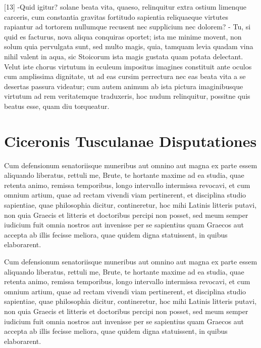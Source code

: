 \documentclass[11pt,b5paper,twoside]{book}
\begin{document}
[13] -Quid igitur? solane beata vita, quaeso, relinquitur extra ostium limenque carceris, cum constantia gravitas fortitudo sapientia reliquaeque virtutes rapiantur ad tortorem nullumque recusent nec supplicium nec dolorem? - Tu, si quid es facturus, nova aliqua conquiras oportet; ista me minime movent, non solum quia pervulgata sunt, sed multo magis, quia, tamquam levia quadam vina nihil valent in aqua, sic Stoicorum ista magis gustata quam potata delectant. Velut iste chorus virtutum in eculeum impositus imagines constituit ante oculos cum amplissima dignitate, ut ad eas cursim perrectura nec eas beata vita a se desertas passura videatur; cum autem animum ab ista pictura imaginibusque virtutum ad rem veritatemque traduxeris, hoc nudum relinquitur, possitne quis beatus esse, quam diu torqueatur.
\beginnumbering
\numberpstarttrue
{}

\chapter*{Ciceronis Tusculanae Disputationes}

\pstart%
Cum defensionum  senatoriisque muneribus aut omnino aut magna ex parte essem aliquando liberatus, rettuli me, Brute, te hortante maxime ad ea studia, quae retenta animo, remissa temporibus, longo intervallo intermissa revocavi, et cum omnium artium, quae ad rectam vivendi viam pertinerent,  et disciplina studio sapientiae, quae philosophia dicitur, contineretur, hoc mihi Latinis litteris  putavi, non quia  Graecis et litteris et doctoribus percipi non posset, sed meum semper iudicium fuit omnia nostros aut invenisse per se sapientius quam Graecos aut accepta ab illis fecisse meliora, quae quidem digna statuissent, in quibus elaborarent.
\pend

\pstart%
Cum defensionum  senatoriisque muneribus aut omnino aut magna ex parte essem aliquando liberatus, rettuli me, Brute, te hortante maxime ad ea studia, quae retenta animo, remissa temporibus, longo intervallo intermissa revocavi, et cum omnium artium, quae ad rectam vivendi viam pertinerent,  et disciplina studio sapientiae, quae philosophia dicitur, contineretur, hoc mihi Latinis litteris  putavi, non quia  Graecis et litteris et doctoribus percipi non posset, sed meum semper iudicium fuit omnia nostros aut invenisse per se sapientius quam Graecos aut accepta ab illis fecisse meliora, quae quidem digna statuissent, in quibus elaborarent.
\pend
\end{document}
